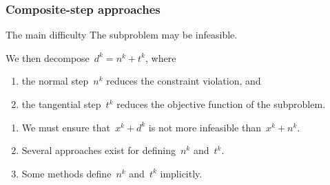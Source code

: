 \documentclass{polyu-presentation}
\begin{document}
\begin{frame}
    \frametitle{Composite-step approaches}

    \begin{block}{The main difficulty}
        The \alert{subproblem} may be \alert{infeasible}.
    \end{block}

    \medskip

    We then \alert{decompose}~$d^k = n^k + t^k$, where
    \begin{enumerate}
        \item the \alert{normal step}~$n^k$ reduces the constraint violation, and
        \item the \alert{tangential step}~$t^k$ reduces the objective function of the subproblem.
    \end{enumerate}


    \medskip

    \begin{block}{}
        \begin{enumerate}[<+(1)->]
            \item We must ensure that~$x^k + d^k$ is \alert{not} more infeasible than~$x^k + n^k$.
            \item \alert{Several approaches} exist for defining~$n^k$ and~$t^k$.
            \item Some methods define~$n^k$ and~$t^k$ \alert{implicitly}.
        \end{enumerate}
    \end{block}
\end{frame}
\end{document}
